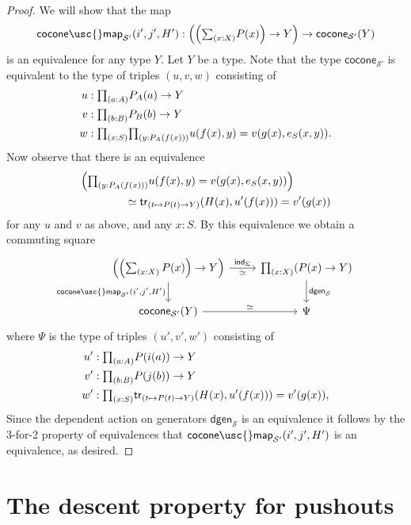 \begin{proof}
We will show that the map
\begin{equation*}
\mathsf{cocone\usc{}map}_{\mathcal{S}'}(i',j',H'): \Big(\Big(\sm{x:X}P(x)\Big)\to Y\Big)\to \mathsf{cocone}_{\mathcal{S}'}(Y)
\end{equation*}
is an equivalence for any type $Y$.
Let $Y$ be a type. Note that the type $\mathsf{cocone}_{\mathcal{S}'}$ is equivalent to the type of triples $(u,v,w)$ consisting of
\begin{align*}
u & : \prd{a:A} P_A(a)\to Y \\
v & : \prd{b:B} P_B(b)\to Y \\
w & : \prd{x:S}{y:P_A(f(x))} u(f(x),y)=v(g(x),e_S(x,y)).
\end{align*}
Now observe that there is an equivalence
\begin{align*}
& \Big(\prd{y:P_A(f(x))} u(f(x),y)=v(g(x),e_S(x,y))\Big) \\
& \qquad \qquad \eqvsym \mathsf{tr}_{(t\mapsto P(t)\to Y)}(H(x),u'(f(x)))=v'(g(x))
\end{align*}
for any $u$ and $v$ as above, and any $x:S$. 
By this equivalence we obtain a commuting square
\begin{equation*}
\begin{tikzcd}
\Big(\Big({\sm{x:X}P(x)}\Big)\to Y\Big) \arrow[r,"\ind{\Sigma}","\eqvsym"'] \arrow[d,swap,"{\mathsf{cocone\usc{}map}_{\mathcal{S}'}(i',j',H')}"] & \prd{x:X}(P(x)\to Y) \arrow[d,"\mathsf{dgen}_{\mathcal{S}}"] \\
\mathsf{cocone}_{\mathcal{S}'}(Y) \arrow[r,"\eqvsym"] & \Psi
\end{tikzcd}
\end{equation*}
where $\Psi$ is the type of triples $(u',v',w')$ consisting of
\begin{align*}
u' & : \prd{a:A} P(i(a))\to Y \\
v' & : \prd{b:B} P(j(b))\to Y \\
w' & : \prd{x:S} \mathsf{tr}_{(t\mapsto P(t)\to Y)}(H(x),u'(f(x)))=v'(g(x)),
\end{align*}
Since the dependent action on generators $\mathsf{dgen}_{\mathcal{S}}$ is an equivalence it follows by the 3-for-2 property of equivalences that $\mathsf{cocone\usc{}map}_{\mathcal{S}'}(i',j',H')$ is an equivalence, as desired.
\end{proof}

\section{The descent property for pushouts}

